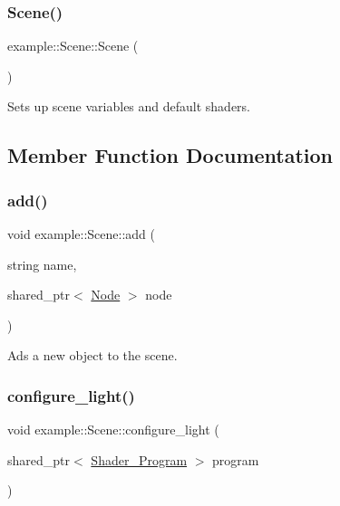 \subsubsection{\texorpdfstring{Scene()}{Scene()}}
{\footnotesize\ttfamily example\+::\+Scene\+::\+Scene (\begin{DoxyParamCaption}{ }\end{DoxyParamCaption})}



Sets up scene variables and default shaders. 



\subsection{Member Function Documentation}
\mbox{\label{classexample_1_1_scene_aad84740d850908b110decaaa3fbd784c}} 
\subsubsection{\texorpdfstring{add()}{add()}}
{\footnotesize\ttfamily void example\+::\+Scene\+::add (\begin{DoxyParamCaption}\item[{string}]{name,  }\item[{shared\+\_\+ptr$<$ \mbox{\hyperlink{classexample_1_1_node}{Node}} $>$}]{node }\end{DoxyParamCaption})\hspace{0.3cm}{\ttfamily [inline]}}



Ads a new object to the scene. 

\mbox{\label{classexample_1_1_scene_ac1d8381ffdb26c061d10fc2d1b3448cc}} 
\subsubsection{\texorpdfstring{configure\+\_\+light()}{configure\_light()}}
{\footnotesize\ttfamily void example\+::\+Scene\+::configure\+\_\+light (\begin{DoxyParamCaption}\item[{shared\+\_\+ptr$<$ \mbox{\hyperlink{classexample_1_1_shader___program}{Shader\+\_\+\+Program}} $>$}]{program }\end{DoxyParamCaption})\hspace{0.3cm}{\ttfamily [virtual]}}



